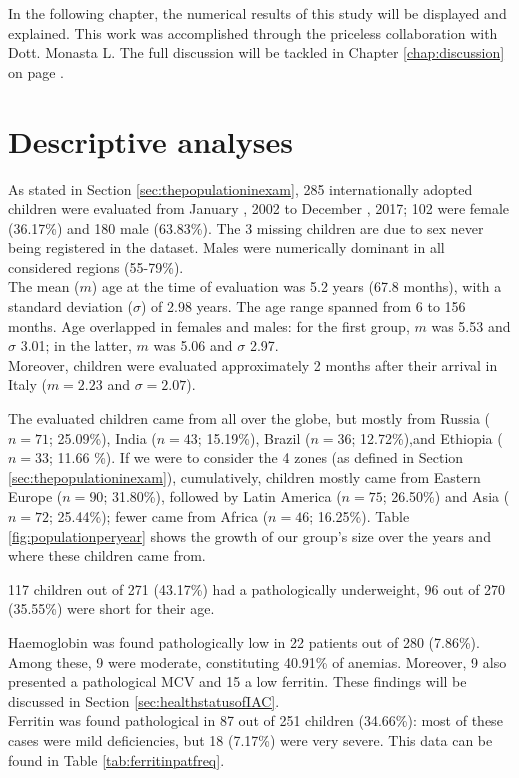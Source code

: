 

\label{chap:results}
In the following chapter, the numerical results of this study will be displayed and explained. This work was accomplished through the priceless collaboration with Dott. Monasta L. The full discussion will be tackled in Chapter \ref{chap:discussion} on page \pageref{chap:discussion}.

\section{Descriptive analyses}\label{sec:descriptiveanalyses}
As stated in Section \ref{sec:thepopulationinexam}, 285 internationally adopted children were evaluated from January , 2002 to December , 2017; 102 were female (36.17\%) and 180 male (63.83\%). The 3 missing children are due to sex never being registered in the dataset. Males were numerically dominant in all considered regions (55-79\%).\\
The mean ($m$) age at the time of evaluation was 5.2 years (67.8 months), with a standard deviation ($\sigma$) of 2.98 years. The age range spanned from 6 to 156 months. Age overlapped in females and males: for the first group, $m$ was 5.53 and $\sigma$ 3.01; in the latter, $m$ was 5.06 and $\sigma$ 2.97.\\
Moreover, children were evaluated approximately 2 months after their arrival in Italy ($m = 2.23$ and $\sigma = 2.07$).

The evaluated children came from all over the globe, but mostly from Russia ($n = 71$; 25.09\%), India ($n = 43$; 15.19\%), Brazil ($n = 36$; 12.72\%),and Ethiopia ($n = 33$; 11.66 \%). If we were to consider the 4 zones (as defined in Section \ref{sec:thepopulationinexam}), cumulatively, children mostly came from Eastern Europe ($n = 90$; 31.80\%), followed by Latin America ($n = 75$; 26.50\%) and Asia ($n = 72$; 25.44\%); fewer came from Africa ($n = 46$; 16.25\%). Table \ref{fig:populationperyear} shows the growth of our group's size over the years and where these children came from.

117 children out of 271 (43.17\%) had a pathologically underweight, 96 out of 270 (35.55\%) were short for their age.

Haemoglobin was found pathologically low in 22 patients out of 280 (7.86\%). Among these, 9 were moderate, constituting 40.91\% of anemias. Moreover, 9 also presented a pathological MCV and 15 a low ferritin. These findings will be discussed in Section \ref{sec:healthstatusofIAC}.\\
Ferritin was found pathological in 87 out of 251 children (34.66\%): most of these cases were mild deficiencies, but 18 (7.17\%) were very severe. This data can be found in Table \ref{tab:ferritinpatfreq}.

